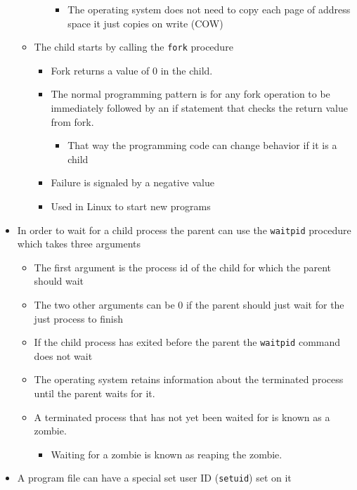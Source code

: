 \documentclass[11pt]{article}
\providecommand{\tightlist}{%
      \setlength{\itemsep}{0pt}\setlength{\parskip}{0pt}}
\begin{document}
\begin{itemize}
\begin{itemize}
\begin{itemize}
      \begin{itemize}
      \tightlist
      \item
        The operating system does not need to copy each page of address
        space it just copies on write (COW)
      \end{itemize}
    \end{itemize}
  \item
    The child starts by calling the \texttt{fork} procedure

    \begin{itemize}
    \tightlist
    \item
      Fork returns a value of 0 in the child.
    \item
      The normal programming pattern is for any fork operation to be
      immediately followed by an if statement that checks the return
      value from fork.

      \begin{itemize}
      \tightlist
      \item
        That way the programming code can change behavior if it is a
        child
      \end{itemize}
    \item
      Failure is signaled by a negative value
    \item
      Used in Linux to start new programs
    \end{itemize}
  \end{itemize}
\item
  In order to wait for a child process the parent can use the
  \texttt{waitpid} procedure which takes three arguments

  \begin{itemize}
  \tightlist
  \item
    The first argument is the process id of the child for which the
    parent should wait
  \item
    The two other arguments can be 0 if the parent should just wait for
    the just process to finish
  \item
    If the child process has exited before the parent the
    \texttt{waitpid} command does not wait
  \item
    The operating system retains information about the terminated
    process until the parent waits for it.
  \item
    A terminated process that has not yet been waited for is known as a
    zombie.

    \begin{itemize}
    \tightlist
    \item
      Waiting for a zombie is known as reaping the zombie.
    \end{itemize}
  \end{itemize}
\item
  A program file can have a special set user ID (\texttt{setuid}) set on
  it


\end{itemize}
\end{document}
